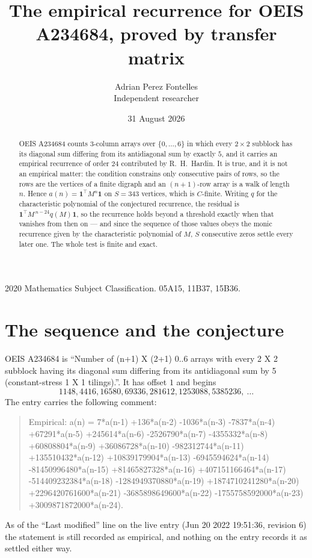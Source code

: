\documentclass[11pt,a4paper]{article}
\title{The empirical recurrence for OEIS A234684, proved by transfer matrix}
\author{Adrian Perez Fontelles\\ \small Independent researcher}
\date{31 August 2026}
\theoremstyle{plain}
\theoremstyle{definition}
\begin{document}
\maketitle

\begin{abstract}
OEIS A234684 counts $3$-column arrays over $\{0,\dots,6\}$ in which every
$2\times2$ subblock has its diagonal sum differing from its antidiagonal sum by
exactly $5$, and it
carries an empirical recurrence of order $24$ contributed by R.~H.~Hardin. It is true,
and it is not an empirical matter: the condition constrains only consecutive pairs of rows,
so the rows are the vertices of a finite digraph and an $(n+1)$-row array is a walk of
length $n$. Hence $a(n)=\mathbf{1}^{\!\top}M^{n}\mathbf{1}$ on $S=343$ vertices, which
is $C$-finite. Writing $q$ for the characteristic polynomial of the conjectured recurrence,
the residual is $\mathbf{1}^{\!\top}M^{\,n-24}q(M)\mathbf{1}$, so the recurrence
holds beyond a threshold exactly when that vanishes from then on --- and since the sequence
of those values obeys the monic recurrence given by the characteristic polynomial of $M$,
$S$ consecutive zeros settle every later one. The whole test is finite and exact.
\end{abstract}

\noindent\small 2020 Mathematics Subject Classification. 05A15, 11B37, 15B36.\normalsize

\section{The sequence and the conjecture}

OEIS A234684 is ``Number of (n+1) X (2+1) 0..6 arrays with every 2 X 2 subblock having its diagonal sum differing from its antidiagonal sum by 5 (constant-stress 1 X 1 tilings).''. It has offset
$1$ and begins
\[
1148, 4416, 16580, 69336, 281612, 1253088, 5385236,\ \dots
\]
The entry carries the following comment:
\begin{quote}\small
Empirical: a(n) = 7*a(n-1) +136*a(n-2) -1036*a(n-3) -7837*a(n-4) +67291*a(n-5) +245614*a(n-6) -2526790*a(n-7) -4355332*a(n-8) +60808804*a(n-9) +36086728*a(n-10) -982312744*a(n-11) +135510432*a(n-12) +10839179904*a(n-13) -6945594624*a(n-14) -81450996480*a(n-15) +81465827328*a(n-16) +407151166464*a(n-17) -514409232384*a(n-18) -1284949370880*a(n-19) +1874710241280*a(n-20) +2296420761600*a(n-21) -3685898649600*a(n-22) -1755758592000*a(n-23) +3009871872000*a(n-24).
\end{quote}
As of the ``Last modified'' line on the live entry (Jun 20 2022 19:51:36, revision 6) the statement is
still recorded as empirical, and nothing on the entry records it as settled either way.
\end{document}
